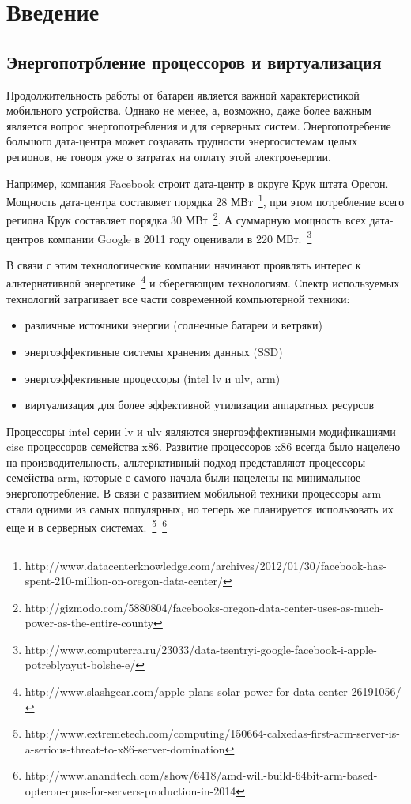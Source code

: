 \chapter{Введение}

\section{Энергопотрбление процессоров и виртуализация}

Продолжительность работы от батареи является важной характеристикой мобильного устройства. Однако не менее, а, возможно, даже более важным является вопрос энергопотребления и для серверных систем. Энергопотребение большого дата-центра может создавать трудности энергосистемам целых регионов, не говоря уже о затратах на оплату этой электроенергии.

Например, компания Facebook строит дата-центр в округе Крук штата Орегон. Мощность дата-центра составляет порядка 28 МВт~\footnote{http://www.datacenterknowledge.com/archives/2012/01/30/facebook-has-spent-210-million-on-oregon-data-center/}, при этом потребление всего региона Крук составляет порядка 30 МВт~\footnote{http://gizmodo.com/5880804/facebooks-oregon-data-center-uses-as-much-power-as-the-entire-county}. А суммарную мощность всех дата-центров компании Google в 2011 году оценивали в 220 МВт.~\footnote{http://www.computerra.ru/23033/data-tsentryi-google-facebook-i-apple-potreblyayut-bolshe-e/}

В связи с этим технологические компании начинают проявлять интерес к альтернативной энергетике~\footnote{http://www.slashgear.com/apple-plans-solar-power-for-data-center-26191056/} и сберегающим технологиям. Спектр используемых технологий затрагивает все части современной компьютерной техники:

\begin{itemize}

    \item различные источники энергии (солнечные батареи и ветряки)
    \item энергоэффективные системы хранения данных (SSD)
    \item энергоэффективные процессоры (intel lv и ulv, arm)
    \item виртуализация для более эффективной утилизации аппаратных ресурсов

\end{itemize}

Процессоры intel серии lv и ulv являются энергоэффективными модификациями cisc процессоров семейства x86. Развитие процессоров x86 всегда было нацелено на производительность, альтернативный подход представляют процессоры семейства arm, которые с самого начала были нацелены на минимальное энергопотребление. В связи с развитием мобильной техники процессоры arm стали одними из самых популярных, но теперь же планируется использовать их еще и в серверных системах.~\footnote{http://www.extremetech.com/computing/150664-calxedas-first-arm-server-is-a-serious-threat-to-x86-server-domination}~\footnote{http://www.anandtech.com/show/6418/amd-will-build-64bit-arm-based-opteron-cpus-for-servers-production-in-2014}

